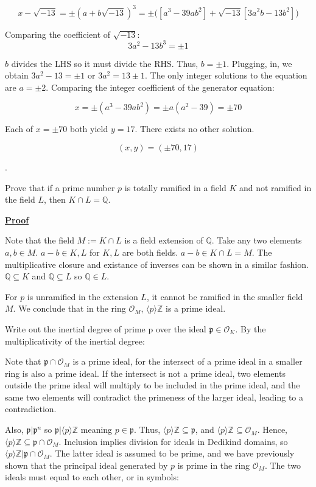 \documentclass{article}
\def\ZZ{{\mathbb{Z}}}
\newcounter{problemcnt}
\newcommand{\Problem}{{
    \vspace{5mm}
    \stepcounter{problemcnt}
    \noindent
    \arabic{problemcnt}. 
}
}
\newcommand{\Proof}{{
    \vspace{2mm}
    \noindent
    \textbf{
    \underline{Proof}}
}
}
\newcommand{\<}{{{
    \langle
}}}
\def\>{{{
    \rangle
}}}
\def\ZZ{{\mathbb{Z}}}
\newcommand{\ringInt}{
    {\mathcal{O}}
}
\newcommand{\pideal}{
    {{\mathfrak{p}}}
}
\def\QQ{\mathbb{Q}}
\begin{document}
\[
    x-\sqrt{-13} = \pm (a+b\sqrt{-13})^3
    = \pm\bigg([a^3-39ab^2] + \sqrt{-13} [3a^2b -13b^2]\bigg)
\]

Comparing the coefficient of $\sqrt{-13}$:
\[
    3a^2-13b^3 = \pm 1
\]

$b$ divides the LHS so it must divide the RHS. Thus, $b = \pm 1$. 
Plugging, in, we obtain $3a^2-13 = \pm1$ or $3a^2 = 13\pm1$. The only 
integer solutions to the equation are $a = \pm2$. Comparing the integer 
coefficient of the generator equation:

\[
    x = \pm (a^3-39ab^2) = \pm a (a^2-39) = \pm 70
\]

Each of $x =\pm70$ both yield $y = 17$. There exists no other solution. 

\[
\boxed{(x, y) = (\pm70, 17)}
\]

\Problem
Prove that if a prime number $p$ is totally ramified in a field 
$K$ and not ramified in the field $L$, then $K \cap L = \QQ$. 

\Proof 
Note that the field $M := K \cap L$ is a field extension of $\QQ$. 
Take any two elements $a, b \in M$. $a - b \in K, L$ for $K, L$ are 
both fields. $a-b \in K \cap L = M$. The multiplicative closure 
and existance of inverses
can be shown in a similar fashion. $\QQ \subseteq K$ and 
$\QQ \subseteq L$ so $\QQ \in L$. 

For $p$ is unramified in the extension $L$, it cannot be 
ramified in the smaller field $M$. We conclude that in the 
ring $\ringInt_M$, $\<p\>\ZZ$ is a prime ideal. 

Write out the inertial degree of prime p
over the ideal $\pideal \in \ringInt_K$. By the multiplicativity 
of the inertial degree: 


Note that $\pideal \cap \ringInt_M$ is a prime ideal, for 
the intersect of a prime ideal in a smaller ring is also 
a prime ideal. If the intersect is not a prime ideal, 
two elements outside the prime ideal will multiply to 
be included in the prime ideal, and the same two elements 
will contradict the primeness of the larger ideal, leading 
to a contradiction. 

Also, $\pideal|\pideal^n$ so $\pideal|\<p\>\ZZ$ meaning $p \in \pideal$. 
Thus, $\<p\>\ZZ \subseteq \pideal$, and $\<p\>\ZZ \subseteq \ringInt_M$. Hence, 
$\<p\>\ZZ \subseteq \pideal \cap \ringInt_M$. Inclusion implies division 
for ideals in Dedikind domains, so $\<p\>\ZZ|\pideal \cap \ringInt_M$. 
The latter ideal is assumed to be prime, and we have previously shown 
that the principal ideal generated by $p$ is prime in the ring $\ringInt_M$. 
The two ideals must equal to each other, or in symbols:
\end{document}
